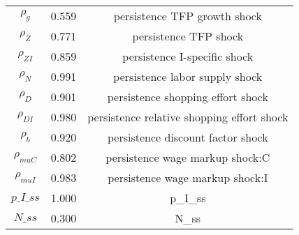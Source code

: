 \begin{center}
\begin{longtable}{ccc}
${\rho_g}$ 	 & 	 0.559 	 & 	 persistence TFP growth shock\\
${\rho_Z}$ 	 & 	 0.771 	 & 	 persistence TFP shock\\
${\rho_{ZI}}$ 	 & 	 0.859 	 & 	 persistence I-specific shock\\
${\rho_N}$ 	 & 	 0.991 	 & 	 persistence labor supply shock\\
${\rho_D}$ 	 & 	 0.901 	 & 	 persistence shopping effort shock\\
${\rho_{DI}}$ 	 & 	 0.980 	 & 	 persistence relative shopping effort shock\\
${\rho_b}$ 	 & 	 0.920 	 & 	 persistence discount factor shock\\
${\rho_{muC}}$ 	 & 	 0.802 	 & 	 persistence wage markup shock:C\\
${\rho_{muI}}$ 	 & 	 0.983 	 & 	 persistence wage markup shock:I\\
$p\_I\_ss$ 	 & 	 1.000 	 & 	 p\_I\_ss\\
$N\_ss$ 	 & 	 0.300 	 & 	 N\_ss\\
\bottomrule%
\end{longtable}
\end{center}
